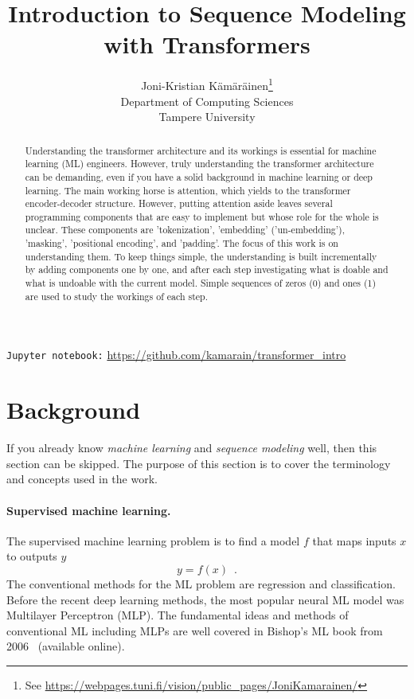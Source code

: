 \documentclass[final]{article}
\title{Introduction to Sequence Modeling with Transformers}
\author{%
  Joni-Kristian K{\"a}m{\"a}r{\"a}inen\thanks{See \url{https://webpages.tuni.fi/vision/public_pages/JoniKamarainen/}}\\
  Department of Computing Sciences\\
  Tampere University
}
\begin{document}
\maketitle


\begin{abstract}
  Understanding the transformer architecture and its workings is
  essential for machine learning (ML) engineers. However, truly
  understanding the transformer architecture can be demanding, even if
  you have a solid background in machine learning or deep
  learning. The main working horse is attention, which yields to the
  transformer encoder-decoder structure. However, putting attention
  aside leaves several programming components that are easy to
  implement but whose role for the whole is unclear. These components
  are 'tokenization', 'embedding' ('un-embedding'), 'masking', 'positional encoding', and 'padding'. The focus of this work is on understanding
  them. To keep things simple, the understanding is built
  incrementally by adding components one by one, and after each step
  investigating what is doable and what is undoable with the current
  model. Simple sequences of zeros (0) and ones (1) are used to study
  the workings of each step.
\end{abstract}

\begin{center}
\texttt{Jupyter notebook:} \url{https://github.com/kamarain/transformer_intro}
\end{center}

\section{Background}
If you already know \textit{machine learning} and
\textit{sequence modeling} well, then this section can be skipped. The
purpose of this section is to 
cover the terminology and concepts used in the work.

\paragraph{Supervised machine learning.}
The supervised machine learning problem is to find a model $f$ that
maps inputs $x$ to outputs $y$
\begin{equation}
  y = f(x) \enspace .
  \label{eq:supervisedML}
\end{equation}
The conventional methods for the ML problem are regression and classification.
Before the recent deep learning methods,
the most popular neural ML model was Multilayer Perceptron (MLP). The
fundamental ideas and methods of conventional ML including MLPs are
well covered in Bishop's ML book from 2006~\cite{MLBook}
(available online).
\end{document}
